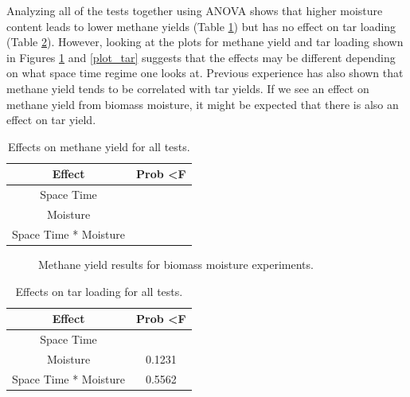 \documentclass[11pt,twocolumn]{article}
\begin{document}
Analyzing all of the tests together using ANOVA shows that higher moisture content leads to lower methane yields (Table \ref{ch4}) but has no effect on tar loading (Table \ref{tar}).  However, looking at the plots for methane yield and tar loading shown in Figures \ref{plot_ch4} and \ref{plot_tar} suggests that the effects may be different depending on what space time regime one looks at.  Previous experience has also shown that methane yield tends to be correlated with tar yields.  If we see an effect on methane yield from biomass moisture, it might be expected that there is also an effect on tar yield.

\begin{table}
	\centering
	\caption{Effects on methane yield for all tests.}
	\label{ch4}
	\begin{tabular}{c c}
	\toprule
	Effect				&	Prob \textless F	\\
	\midrule
	Space Time			&	\color{red}{\textless 0.0001} \\
	Moisture				&	\color{red}{0.0014} \\
	Space Time * Moisture	&	\color{red}{0.0061} \\
	\midrule
	\end{tabular}
\end{table}

\begin{figure}
	\centering
	\caption{Methane yield results for biomass moisture experiments.}
	\label{plot_ch4}
\end{figure}

\begin{table}
	\centering
	\caption{Effects on tar loading for all tests.}
	\label{tar}
	\begin{tabular}{c c}
	\toprule
	Effect				&	Prob \textless F	\\
	\midrule
	Space Time			&	\color{red}{\textless 0.0001} \\
	Moisture				&	0.1231 \\
	Space Time * Moisture	&	0.5562 \\
	\bottomrule
	\end{tabular}
\end{table}
\end{document}

